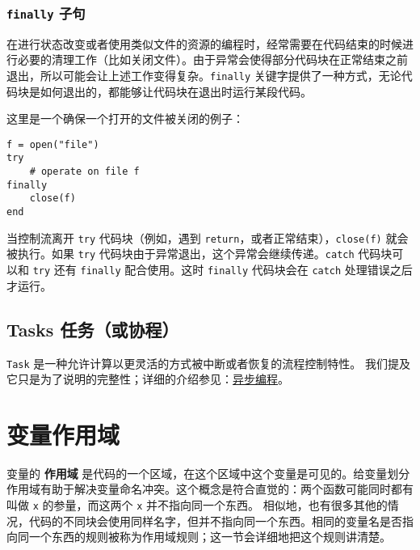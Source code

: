 \subsection{\texttt{finally} 子句}



在进行状态改变或者使用类似文件的资源的编程时，经常需要在代码结束的时候进行必要的清理工作（比如关闭文件）。由于异常会使得部分代码块在正常结束之前退出，所以可能会让上述工作变得复杂。\texttt{finally} 关键字提供了一种方式，无论代码块是如何退出的，都能够让代码块在退出时运行某段代码。



这里是一个确保一个打开的文件被关闭的例子：




\begin{verbatim}
f = open("file")
try
    # operate on file f
finally
    close(f)
end
\end{verbatim}



当控制流离开 \texttt{try} 代码块（例如，遇到 \texttt{return}，或者正常结束），\texttt{close(f)} 就会被执行。如果 \texttt{try} 代码块由于异常退出，这个异常会继续传递。\texttt{catch} 代码块可以和 \texttt{try} 还有 \texttt{finally} 配合使用。这时 \texttt{finally} 代码块会在 \texttt{catch} 处理错误之后才运行。



\hypertarget{15038256797533490288}{}


\section{ Tasks 任务（或协程）}



\texttt{Task} 是一种允许计算以更灵活的方式被中断或者恢复的流程控制特性。 我们提及它只是为了说明的完整性；详细的介绍参见：\hyperlink{12788188476310754107}{异步编程}。



\hypertarget{14993622729045334657}{}


\chapter{变量作用域}



变量的 \textbf{作用域} 是代码的一个区域，在这个区域中这个变量是可见的。给变量划分作用域有助于解决变量命名冲突。这个概念是符合直觉的：两个函数可能同时都有叫做 \texttt{x} 的参量，而这两个 \texttt{x} 并不指向同一个东西。 相似地，也有很多其他的情况，代码的不同块会使用同样名字，但并不指向同一个东西。相同的变量名是否指向同一个东西的规则被称为作用域规则；这一节会详细地把这个规则讲清楚。



